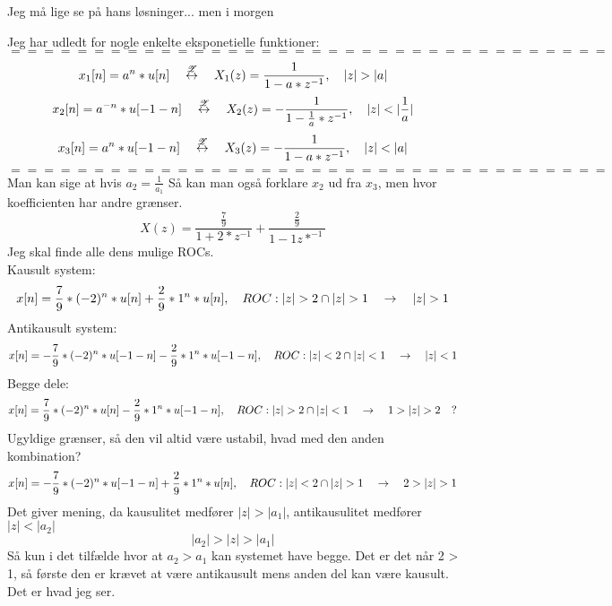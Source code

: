\begin{Opgaver}
\begin{kapitel}[Z transformation]
\begin{Opgave}
\begin{Udklip}
\begin{UnderOpgave}[\text{$X(z) = \filterZ{1}{1, 0.75, 0.125},\tab{0}$ x[n] is absolutely summable}]
                    Jeg må lige se på hans løsninger... men i morgen
                \end{UnderOpgave}\setcounter{alfabetTabular}{0}
            \end{Udklip}
            \begin{UnderOpgave}[\text{$X(z) = \filterZ{1, -1/3}{1, 1, -2}$, Alle ROCs skal findes}]
                Jeg har udledt for nogle enkelte eksponetielle funktioner: 
                \[====================================                                                                                          \]
                \[x_1[n] = a^n*u[n] \transformation{Z} X_1(z) = \frac{1}{1 - a*z^{-1}}, \tab{0} |z| > |a|                                          \]
                \[x_2[n] = a^{-n}*u[-1-n] \transformation{Z} X_2(z) = -\frac{1}{1 - \frac{1}{a}*z^{-1}}, \tab{0} |z| < |\frac{1}{a}|                \]
                \[x_3[n] = a^n*u[-1-n] \transformation{Z} X_3(z) = - \frac{1}{1 - a*z^{-1}}, \tab{0} |z|<|a|                                       \]
                \[====================================                                                                                          \]
                Man kan sige at hvis $a_2 = \frac{1}{a_1}$ Så kan man også forklare $x_2$ ud fra $x_3$, men hvor koefficienten har andre grænser. 
                \[X(z) = \frac{\frac{7}{9}}{1 + 2*z^{-1}} + \frac{\frac{2}{9}}{1 - 1z*^{-1}} \]
                Jeg skal finde alle dens mulige ROCs. \\
                Kausult system: 
                \[x[n] = \frac{7}{9} * (-2)^n * u[n]        + \frac{2}{9} * 1^n * u[n]   , \tab{0} ROC: |z| > 2 \cap |z| > 1 \tab{0} \rightarrow \tab{0} |z| > 1\]
                Antikausult system: 
                \[x[n] = -\frac{7}{9} * (-2)^n * u[-1 -n]   - \frac{2}{9} * 1^n * u[-1-n], \tab{0} ROC: |z| < 2 \cap |z| < 1 \tab{0} \rightarrow \tab{0} |z| < 1\]
                Begge dele: 
                \[x[n] = \frac{7}{9} * (-2)^n * u[n]        - \frac{2}{9} * 1^n * u[-1-n], \tab{0} ROC: |z| > 2 \cap |z| < 1 \tab{0} \rightarrow \tab{0} 1 > |z| > 2 \tab{0} ?\]
                Ugyldige grænser, så den vil altid være ustabil, hvad med den anden kombination? 
                \[x[n] = -\frac{7}{9} * (-2)^n * u[-1 -n]   + \frac{2}{9} * 1^n * u[n]   , \tab{0} ROC: |z| < 2 \cap |z| > 1 \tab{0} \rightarrow \tab{0} 2 > |z| > 1\]
                Det giver mening, da kausulitet medfører $|z| > |a_1|$, antikausulitet medfører $|z| < |a_2|$
                \[|a_2| > |z| > |a_1|\]
                Så kun i det tilfælde hvor at $a_2 > a_1$ kan systemet have begge. Det er det når 2 > 1, så første den er krævet at være antikausult mens anden del kan være kausult. Det er hvad jeg ser. \\\\\\

\end{UnderOpgave}
\end{Opgave}
\end{kapitel}
\end{Opgaver}
